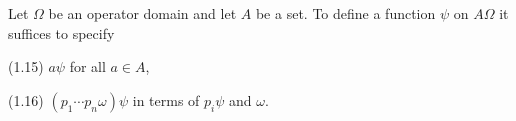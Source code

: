 Let $\Omega$ be an operator domain and let $A$ be a set. To define a function $\psi$ on $A\Omega$ it suffices to specify

(1.15) $a\psi$ for all $a \in A$,

(1.16) $(p_1 \cdots p_n \omega)\psi$ in terms of $p_i\psi$ and $\omega$.
